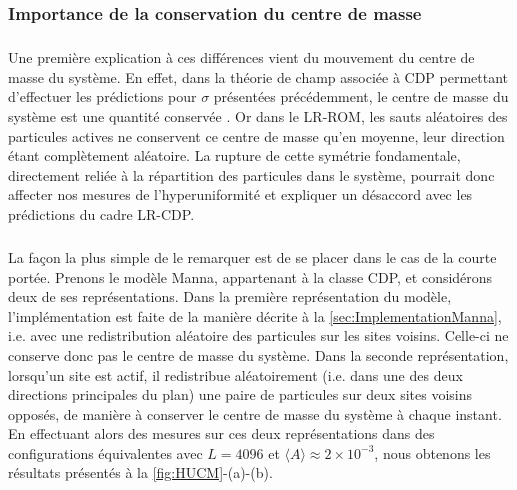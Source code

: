 \subsubsection{Importance de la conservation du centre de masse}

\subparagraph{}Une première explication à ces différences vient du mouvement du centre de masse du système. En effet, dans la théorie de champ associée à CDP permettant d'effectuer les prédictions pour $\sigma$ présentées précédemment, le centre de masse du système est une quantité conservée \cite{wiese_blabla}. Or dans le LR-ROM, les sauts aléatoires des particules actives ne conservent ce centre de masse qu'en moyenne, leur direction étant complètement aléatoire. La rupture de cette symétrie fondamentale, directement reliée à la répartition des particules dans le système, pourrait donc affecter nos mesures de l'hyperuniformité et expliquer un désaccord avec les prédictions du cadre LR-CDP.

\subparagraph{}La façon la plus simple de le remarquer est de se placer dans le cas de la courte portée. Prenons le modèle Manna, appartenant à la classe CDP, et considérons deux de ses représentations. Dans la première représentation du modèle, l'implémentation est faite de la manière décrite à la \autoref{sec:ImplementationManna}, i.e. avec une redistribution aléatoire des particules sur les sites voisins. Celle-ci ne conserve donc pas le centre de masse du système. Dans la seconde représentation, lorsqu'un site est actif, il redistribue aléatoirement (i.e. dans une des deux directions principales du plan) une paire de particules sur deux sites voisins opposés, de manière à conserver le centre de masse du système à chaque instant. En effectuant alors des mesures sur ces deux représentations dans des configurations équivalentes avec $L=4096$ et $\langle A \rangle \approx 2\times 10^{-3}$, nous obtenons les résultats présentés à la \autoref{fig:HUCM}-(a)-(b).

